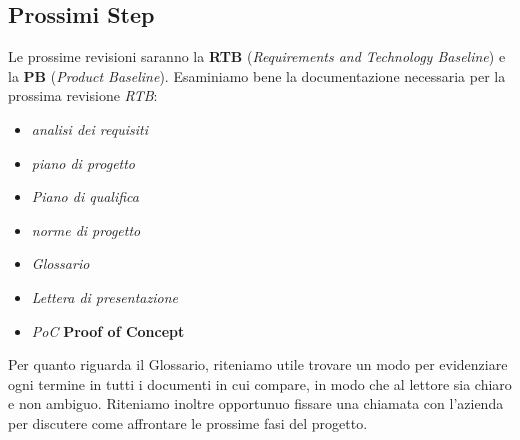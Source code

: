\documentclass{article}
\begin{document}
\subsection{Prossimi Step}
Le prossime revisioni saranno la \textbf{RTB} (\textit{Requirements and Technology Baseline}) e la \textbf{PB} (\textit{Product Baseline}).
Esaminiamo bene la documentazione necessaria per la prossima revisione \emph{RTB}:
\begin{itemize}
    \item \textit{analisi dei requisiti}
    \item \textit{piano di progetto}
    \item \textit{Piano di qualifica}
    \item \textit{norme di progetto}
    \item \textit{Glossario}
    \item \textit{Lettera di presentazione}
    \item \emph{PoC} \textbf{Proof of Concept}
\end{itemize}
Per quanto riguarda il Glossario, riteniamo utile trovare un modo per evidenziare ogni termine in tutti i documenti in cui compare, in modo che al lettore sia chiaro e non ambiguo.
Riteniamo inoltre opportunuo fissare una chiamata con l'azienda per discutere come affrontare le prossime fasi del progetto.
\end{document}
